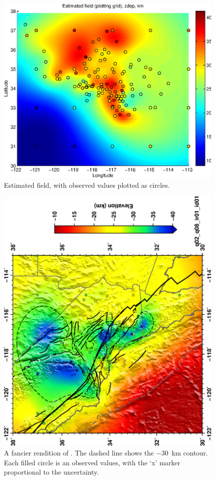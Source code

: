 \documentclass[11pt,titlepage,fleqn]{article}
\begin{document}
\begin{figure}
\includegraphics[width=16cm]{fig1D_8.eps}
\caption[]
{{
Estimated field, with observed values plotted as circles.
\label{fig:1D_8}
}}
\end{figure}

\begin{figure}
\includegraphics[width=14cm,angle=-90]{socal_moho03_q02_q08.eps}
\caption[]
{{
A fancier rendition of . The dashed line shows the $-30$~km contour.
Each filled circle is an observed values, with the `x' marker proportional to the uncertainty.
\label{fig:socal_moho}
}}
\end{figure}
\end{document}
